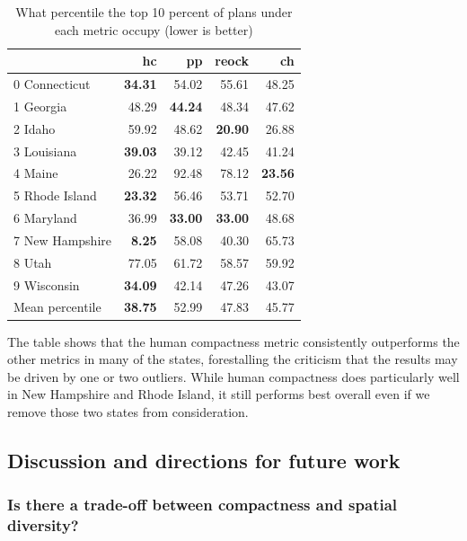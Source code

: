 \documentclass[]{article}
\begin{document}
\begin{table}[h!]
\begin{center}
\caption{What percentile the top 10 percent of plans under each metric occupy (lower is better)}
\label{table:top_plans_sd_percentile}
\begin{tabular}{lrrrr}
\toprule
{} &     hc &     pp &  reock &     ch \\
\midrule
0 Connecticut &  \textbf{34.31} &  54.02 &  55.61 &  48.25 \\
1 Georgia &  48.29 &  \textbf{44.24} &  48.34 &  47.62 \\
2 Idaho &  59.92 &  48.62 &  \textbf{20.90} &  26.88 \\
3 Louisiana &  \textbf{39.03} &  39.12 &  42.45 &  41.24 \\
4 Maine &  26.22 &  92.48 &  78.12 &  \textbf{23.56} \\
5 Rhode Island &  \textbf{23.32} &  56.46 &  53.71 &  52.70 \\
6 Maryland &  36.99 &  \textbf{33.00} &  \textbf{33.00} &  48.68 \\
7 New Hampshire &   \textbf{8.25} &  58.08 &  40.30 &  65.73 \\
8 Utah &  77.05 &  61.72 &  58.57 &  59.92 \\
9 Wisconsin &  \textbf{34.09} &  42.14 &  47.26 &  43.07 \\
\bottomrule
Mean percentile & \textbf{38.75} &  52.99  &  47.83 &  45.77 \\
\bottomrule
\end{tabular}
\end{center}
\end{table}

The table shows that the human compactness metric consistently
outperforms the other metrics in many of the states, forestalling the
criticism that the results may be driven by one or two outliers. While
human compactness does particularly well in New Hampshire and Rhode
Island, it still performs best overall even if we remove those two
states from consideration.

\hypertarget{discussion-and-directions-for-future-work}{%
\subsection{Discussion and directions for future
work}\label{discussion-and-directions-for-future-work}}

\hypertarget{is-there-a-trade-off-between-compactness-and-spatial-diversity}{%
\subsubsection{Is there a trade-off between compactness and spatial
diversity?}\label{is-there-a-trade-off-between-compactness-and-spatial-diversity}}
\end{document}
